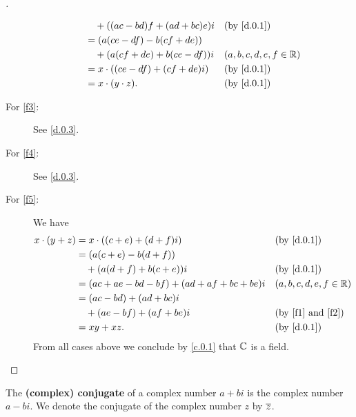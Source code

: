 \begin{proof}[]
\begin{description}
\begin{align*}
                            & \quad + ((ac - bd) f + (ad + bc) e) i &  & \by{d.0.1}                \\
                            & = (a (ce - df) - b (cf + de))                                        \\
                            & \quad + (a (cf + de) + b(ce - df)) i  &  & (a, b, c, d, e, f \in \R) \\
                            & = x \cdot ((ce - df) + (cf + de) i)   &  & \by{d.0.1}                \\
                            & = x \cdot (y \cdot z).                &  & \by{d.0.1}
      \end{align*}
    \item[For \ref{f3}:]
      See \cref{d.0.3}.
    \item[For \ref{f4}:]
      See \cref{d.0.3}.
    \item[For \ref{f5}:]
      We have
      \begin{align*}
        x \cdot (y + z) & = x \cdot ((c + e) + (d + f) i)               &  & \by{d.0.1}                        \\
                        & = (a (c + e) - b (d + f))                                                            \\
                        & \quad + (a (d + f) + b (c + e)) i             &  & \by{d.0.1}                        \\
                        & = (ac + ae - bd - bf) + (ad + af + bc + be) i &  & (a, b, c, d, e, f \in \R)         \\
                        & = (ac - bd) + (ad + bc) i                                                            \\
                        & \quad + (ae - bf) + (af + be) i               &  & \text{(by \ref{f1} and \ref{f2})} \\
                        & = xy + xz.                                    &  & \by{d.0.1}
      \end{align*}
      From all cases above we conclude by \cref{c.0.1} that \(\mathbb{C}\) is a field.
  \end{description}
\end{proof}

\begin{defn}\label{d.0.4}
  The \textbf{(complex) conjugate} of a complex number \(a + bi\) is the complex number \(a - bi\).
  We denote the conjugate of the complex number \(z\) by \(\overline{z}\).
\end{defn}

